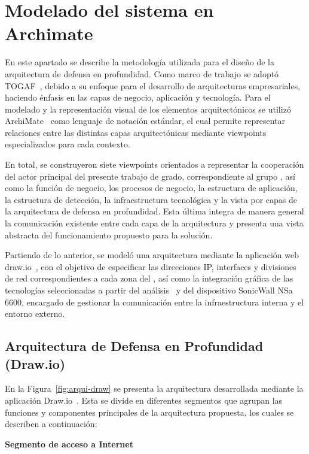 \section{Modelado del sistema en Archimate}
\noindent

En este apartado se describe la metodología utilizada para el diseño de la arquitectura de defensa en profundidad. Como marco de 
trabajo se adoptó TOGAF~\cite{togaf-standard}, debido a su enfoque para el desarrollo de arquitecturas empresariales, haciendo 
énfasis en las capas de negocio, aplicación y tecnología. Para el modelado y la representación visual de los elementos arquitectónicos se 
utilizó ArchiMate~\cite{ArchiMate3_2} como lenguaje de notación estándar, el cual permite representar relaciones entre las distintas capas 
arquitectónicas mediante viewpoints especializados para cada contexto.

En total, se construyeron siete viewpoints orientados a representar la cooperación del actor principal del presente trabajo de grado, 
correspondiente al grupo \GRID, así como la función de negocio, los procesos de negocio, la estructura de aplicación, la estructura de 
detección, la infraestructura tecnológica y la vista por capas de la arquitectura de defensa en profundidad. Esta última integra de manera 
general la comunicación existente entre cada capa de la arquitectura y presenta una vista abstracta del funcionamiento propuesto para la 
solución.

Partiendo de lo anterior, se modeló una arquitectura mediante la aplicación web draw.io~\cite{drawio}, con el objetivo de especificar las 
direcciones IP, interfaces y divisiones de red correspondientes a cada zona del \GRID, así como la integración gráfica de las tecnologías 
seleccionadas a partir del análisis \DAR\ y del dispositivo SonicWall NSa 6600, encargado de gestionar la comunicación entre la 
infraestructura interna y el entorno externo.


\subsection{Arquitectura de Defensa en Profundidad (Draw.io)}
\noindent
En la Figura~\ref{fig:arqui-draw} se presenta la arquitectura desarrollada mediante la aplicación Draw.io~\cite{drawio}. Esta se divide en diferentes 
segmentos que agrupan las funciones y componentes principales de la arquitectura propuesta, los cuales se describen a continuación:

\textbf{Segmento de acceso a Internet}

